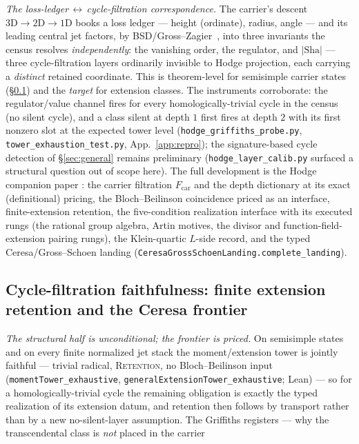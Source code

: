 \documentclass[11pt]{article}
\theoremstyle{definition}
\newcommand{\Sha}{\mathrm{Sha}}
\begin{document}
\medskip
\emph{The loss-ledger$\,\leftrightarrow\,$cycle-filtration correspondence.}
The carrier's descent $3\mathrm D\!\to\!2\mathrm D\!\to\!1\mathrm D$ books a
loss ledger --- height (ordinate), radius, angle --- and its leading central
jet factors, by BSD/Gross--Zagier~\cite{BSD,GrossZagier}, into three
invariants the census resolves \emph{independently}: the vanishing order,
the regulator, and $|\Sha|$ --- three cycle-filtration layers ordinarily
invisible to Hodge projection, each carrying a \emph{distinct} retained
coordinate.  This is theorem-level for semisimple carrier states
(\S\ref{sec:hodge-companion}) and the \emph{target} for extension classes.
The instruments corroborate: the regulator/value channel fires for every
homologically-trivial cycle in the census (no silent cycle), and a class
silent at depth $1$ first fires at depth $2$ with its first nonzero slot at
the expected tower level (\texttt{hodge\_griffiths\_probe.py},
\texttt{tower\_exhaustion\_test.py}, App.~\ref{app:repro}); the
signature-based cycle detection of \S\ref{sec:general} remains preliminary
(\texttt{hodge\_layer\_calib.py} surfaced a structural question out of
scope here).  The full development is the Hodge companion paper
\cite{HodgeCompanion}: the carrier filtration $F_{\mathrm{car}}$ and the
depth dictionary at its exact (definitional) pricing, the Bloch--Beilinson
coincidence priced as an interface, finite-extension retention, the
five-condition realization interface with its executed rungs (the rational
group algebra, Artin motives, the divisor and function-field-extension
pairing rungs), the Klein-quartic $L$-side record, and the typed
Ceresa/Gross--Schoen landing
(\texttt{CeresaGrossSchoenLanding.complete\_landing}). \subsection{Cycle-filtration faithfulness: finite extension retention and the Ceresa frontier}\label{sec:hodge-companion}
\emph{The structural half is unconditional; the frontier is priced.}  On
semisimple states and on every finite normalized jet stack the
moment/extension tower is jointly faithful --- trivial radical,
\textsc{Retention}, no Bloch--Beilinson input
(\texttt{momentTower\_exhaustive},
\texttt{generalExtensionTower\_exhaustive}; Lean) --- so for a
homologically-trivial cycle the remaining obligation is exactly the typed
realization of its extension datum, and retention then follows by transport
rather than by a new no-silent-layer assumption.  The Griffiths registers
--- why the transcendental class is \emph{not} placed in the carrier
\end{document}
